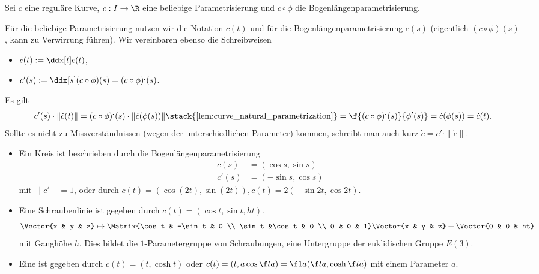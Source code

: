 \begin{conv}
	Sei $c$ eine reguläre Kurve, $c: I \to \R$ eine beliebige Parametrisierung und $c \circ \phi$ die Bogenlängenparametrisierung.

	Für die beliebige Parametrisierung nutzen wir die Notation $c(t)$ und für die Bogenlängenparametrisierung $c(s)$ (eigentlich $(c \circ \phi)(s)$, kann zu Verwirrung führen).
	Wir vereinbaren ebenso die Schreibweisen
	\begin{itemize}
		\item
			$\dot c(t) := \ddx[t] c(t)$,
		\item
			$c'(s) := \ddx[s] (c \circ \phi)(s) = (c \circ \phi)^\centerdot (s)$.
	\end{itemize}
	Es gilt
	\[
		c'(s) \cdot \|\dot c(t)\|
		= (c \circ \phi)^\centerdot (s) \cdot \| \dot c(\phi(s)) \|
		\stack{\ref{lem:curve_natural_parametrization}}= \f {(c \circ \phi)^\centerdot (s)}{\phi'(s)}
		= \dot c (\phi(s))
		= \dot c(t).
	\]
	Sollte es nicht zu Missverständnissen (wegen der unterschiedlichen Parameter) kommen, schreibt man auch kurz $\dot c = c' \cdot \|\dot c\|$.
\end{conv}

\begin{ex}
	\begin{itemize}
		\item
			Ein Kreis ist beschrieben durch die Bogenlängenparametrisierung
			\begin{align*}
				c(s) &= (\cos s, \sin s) \\
				c'(s) &= (-\sin s, \cos s)
			\end{align*}
			mit $\|c'\| = 1$, oder durch $c(t) = (\cos (2t), \sin(2t)), \dot c(t) = 2(-\sin 2t, \cos 2t)$.
		\item
			Eine Schraubenlinie ist gegeben durch $c(t) = (\cos t, \sin t, ht)$.
			\[
				\Vector{x & y & z}
				\mapsto
				\Matrix{\cos t & -\sin t & 0 \\ \sin t &\cos t & 0 \\ 0 & 0 & 1}
				\Vector{x & y & z}
				+ \Vector{0 & 0 & ht}
			\]
			mit Ganghöhe $h$.
			Dies bildet die $1$-Parametergruppe von Schraubungen, eine Untergruppe der euklidischen Gruppe $E(3)$.
		\item
			Eine  ist gegeben durch $c(t) = (t, \cosh t)$ oder $c(t) = (t, a \cos \f ta) = \f 1a (\f ta, \cosh \f ta)$ mit einem Parameter $a$.
	\end{itemize}
\end{ex}

